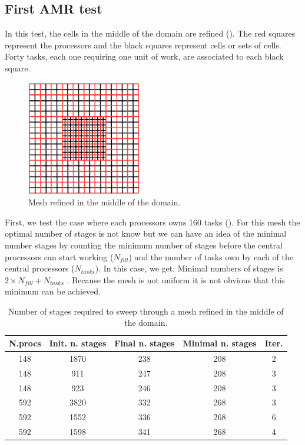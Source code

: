 \documentclass[letterpaper]{article}
\renewcommand{\(}{\left(}
\renewcommand{\)}{\right)}
\renewcommand{\[}{\left[}
\renewcommand{\]}{\right]}
\begin{document}
\subsection{First AMR test}
In this test, the cells in the middle of the domain are refined ().
The red squares represent the processors and the black squares represent cells
or sets of cells. Forty tasks, each one requiring one unit of work, are
associated to each black square.
\begin{figure}[H]
  \centering
  \includegraphics[width=5cm]{mesh}
  \caption{Mesh refined in the middle of the domain.}
  \label{mesh_1}
\end{figure}
First, we test the case where each processors owns 160 tasks (). For
this mesh the optimal number of stages is not know but we can have an idea of
the minimal number stages by counting the minimum number of stages before the
central processors can start working ($N_{fill}$)
and the number of tasks own by each of the central processors ($N_{tasks}$). In
this case, we get: Minimal numbers of stages is $2\times N_{fill}+N_{tasks}$
\cite{Adams2013}. Because the mesh is not uniform it is not obvious that this
minimum can be achieved. 
\begin{table}[H]
  \begin{center}
    \begin{tabular}{|c|c|c|c|c|}
      \hline
      N.procs & Init. n. stages & Final n. stages & Minimal n. stages & Iter. \\
      \hline
      148 & 1870 & 238 & 208 & 2 \\
      148 &  911 & 247 & 208 & 3 \\
      148 &  923 & 246 & 208 & 3 \\
      592 & 3820 & 332 & 268 & 3 \\
      592 & 1552 & 336 & 268 & 6 \\
      592 & 1598 & 341 & 268 & 4 \\
      \hline
    \end{tabular}
    \caption{Number of stages required to sweep through a mesh refined
    in the middle of the domain.}
    \label{amr_1}
  \end{center}
\end{table}
\end{document}
